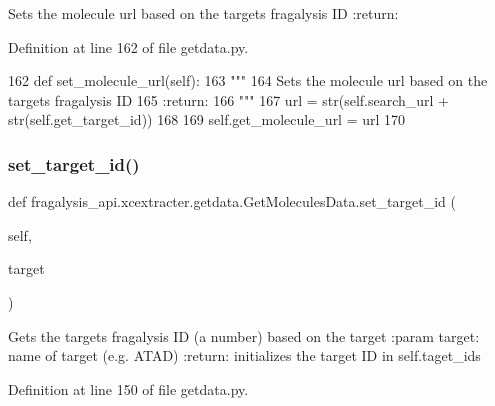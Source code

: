 \begin{DoxyVerb}Sets the molecule url based on the targets fragalysis ID
:return:
\end{DoxyVerb}
 

Definition at line 162 of file getdata.\+py.


\begin{DoxyCode}
162     \textcolor{keyword}{def }set\_molecule\_url(self):
163         \textcolor{stringliteral}{"""}
164 \textcolor{stringliteral}{        Sets the molecule url based on the targets fragalysis ID}
165 \textcolor{stringliteral}{        :return:}
166 \textcolor{stringliteral}{        """}
167         url = str(self.search\_url + str(self.get\_target\_id))
168 
169         self.get\_molecule\_url = url
170 
\end{DoxyCode}
\mbox{\label{classfragalysis__api_1_1xcextracter_1_1getdata_1_1_get_molecules_data_acc782fb40405a434903f6d3e80624c9c}} 
\subsubsection{\texorpdfstring{set\+\_\+target\+\_\+id()}{set\_target\_id()}}
{\footnotesize\ttfamily def fragalysis\+\_\+api.\+xcextracter.\+getdata.\+Get\+Molecules\+Data.\+set\+\_\+target\+\_\+id (\begin{DoxyParamCaption}\item[{}]{self,  }\item[{}]{target }\end{DoxyParamCaption})}

\begin{DoxyVerb}Gets the targets fragalysis ID (a number) based on the target
:param target: name of target (e.g. ATAD)
:return: initializes the target ID in self.taget_ids
\end{DoxyVerb}
 

Definition at line 150 of file getdata.\+py.


